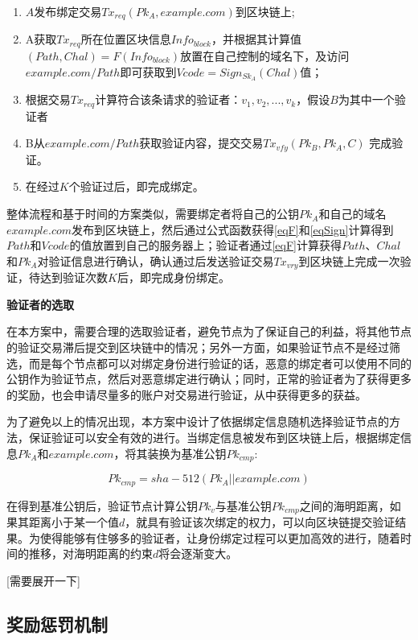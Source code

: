 \begin{enumerate}
	\item $A$发布绑定交易$Tx_{req}(Pk_A, example.com)$到区块链上;
	\item  A获取$Tx_{req}$所在位置区块信息$Info_{block}$，并根据其计算值$(Path, Chal) = F(Info_{block})$放置在自己控制的域名下，及访问$example.com/Path$即可获取到$Vcode = Sign_{Sk_A}(Chal)$值；
	\item 根据交易$Tx_{req}$计算符合该条请求的验证者：${v_1, v_2, ... , v_k}$，假设$B$为其中一个验证者
	\item B从$example.com/Path$获取验证内容，提交交易$Tx_{vfy}(Pk_B, Pk_A, C)$ 完成验证。
	\item 在经过$K$个验证过后，即完成绑定。
\end{enumerate}

整体流程和基于时间的方案类似，需要绑定者将自己的公钥$Pk_A$和自己的域名$example.com$发布到区块链上，然后通过公式函数获得\eqref{eqF}和\eqref{eqSign}计算得到$Path$和$Vcode$的值放置到自己的服务器上；验证者通过\eqref{eqF}计算获得$Path$、$Chal$和$Pk_A$对验证信息进行确认，确认通过后发送验证交易$Tx_{vry}$到区块链上完成一次验证，待达到验证次数$K$后，即完成身份绑定。

\noindent\textbf{验证者的选取}

在本方案中，需要合理的选取验证者，避免节点为了保证自己的利益，将其他节点的验证交易滞后提交到区块链中的情况；另外一方面，如果验证节点不是经过筛选，而是每个节点都可以对绑定身份进行验证的话，恶意的绑定者可以使用不同的公钥作为验证节点，然后对恶意绑定进行确认；同时，正常的验证者为了获得更多的奖励，也会申请尽量多的账户对交易进行验证，从中获得更多的获益。

为了避免以上的情况出现，本方案中设计了依据绑定信息随机选择验证节点的方法，保证验证可以安全有效的进行。当绑定信息被发布到区块链上后，根据绑定信息$Pk_A$和$example.com$，将其装换为基准公钥$Pk_{cmp}$:

\begin{equation}\label{eqGenCmpPk}
Pk_{cmp} = sha-512(Pk_A||example.com)
\end{equation}

在得到基准公钥后，验证节点计算公钥$Pk_v$与基准公钥$Pk_{cmp}$之间的海明距离，如果其距离小于某一个值$d$，就具有验证该次绑定的权力，可以向区块链提交验证结果。为使得能够有住够多的验证者，让身份绑定过程可以更加高效的进行，随着时间的推移，对海明距离的约束$d$将会逐渐变大。

[需要展开一下]




\subsection{奖励惩罚机制}

